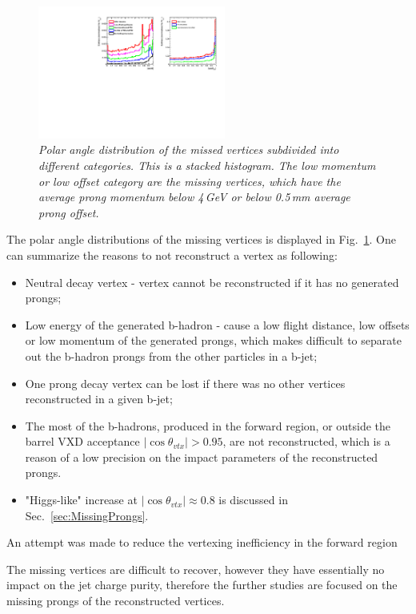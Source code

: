 \begin{figure}[h]
{\centering
    \includegraphics[clip, trim=10.cm 0cm 0.cm 0cm, width=0.55\textwidth]{ILD/plots/missed-cos-vtx.pdf}
    \caption{\sl Polar angle distribution of the missed vertices subdivided into different categories. This is a stacked histogram. The low momentum or low offset category are the missing vertices, which have the average prong momentum below  4\,GeV or below 0.5\,mm average prong offset.
    }
    \label{fig:MissedCos_3}
  }
\end{figure}

The polar angle distributions of the missing vertices is displayed in Fig.~\ref{fig:MissedCos_3}. 
One can summarize the reasons to not reconstruct a vertex as following: 
\begin{itemize}
\item Neutral decay vertex - vertex cannot be reconstructed if it has no generated prongs;
\item Low energy of the generated b-hadron - cause a low flight distance, low offsets or low momentum of the generated prongs, which makes difficult to separate out the b-hadron prongs from the other particles in a b-jet;
\item One prong decay vertex can be lost if there was no other vertices reconstructed in a given b-jet;
\item The most of the b-hadrons, produced in the forward region, or outside the barrel VXD acceptance $|\cos\theta_{vtx}| > 0.95$, are not reconstructed, which is a reason of a low precision on the impact parameters of the reconstructed prongs. 
\item "Higgs-like" increase at $|\cos\theta_{vtx}| \approx 0.8$ is discussed in Sec.~\ref{sec:MissingProngs}.
\end{itemize}

An attempt was made to reduce the vertexing inefficiency in the forward region

The missing vertices are difficult to recover, however they have essentially no impact on the jet charge purity, therefore the further studies are focused on the missing prongs of the reconstructed vertices.
